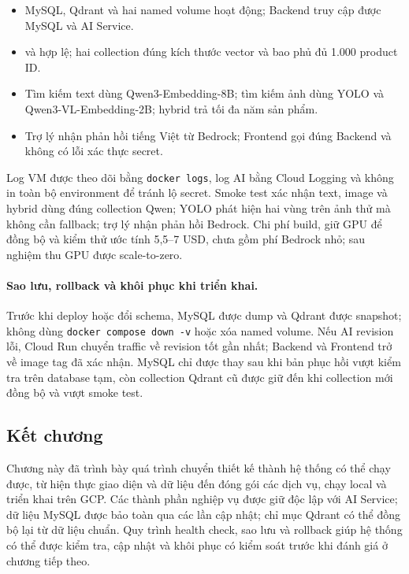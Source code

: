 \begin{itemize}
    \item MySQL, Qdrant và hai named volume hoạt động; Backend truy cập được MySQL và AI Service.
    \item {} và  hợp lệ; hai collection đúng kích thước vector và bao phủ đủ 1.000 product ID.
    \item Tìm kiếm text dùng Qwen3-Embedding-8B; tìm kiếm ảnh dùng YOLO và Qwen3-VL-Embedding-2B; hybrid trả tối đa năm sản phẩm.
    \item Trợ lý nhận phản hồi tiếng Việt từ Bedrock; Frontend gọi đúng Backend và không có lỗi xác thực secret.
\end{itemize}
Log VM được theo dõi bằng \texttt{docker logs}, log AI bằng Cloud Logging và không in toàn bộ environment để tránh lộ secret. Smoke test xác nhận text, image và hybrid dùng đúng collection Qwen; YOLO phát hiện hai vùng trên ảnh thử mà không cần fallback; trợ lý nhận phản hồi Bedrock. Chi phí build, giữ GPU để đồng bộ và kiểm thử ước tính 5,5--7 USD, chưa gồm phí Bedrock nhỏ; sau nghiệm thu GPU được scale-to-zero.

\paragraph{Sao lưu, rollback và khôi phục khi triển khai.}

Trước khi deploy hoặc đổi schema, MySQL được dump và Qdrant được snapshot; không dùng \texttt{docker compose down -v} hoặc xóa named volume. Nếu AI revision lỗi, Cloud Run chuyển traffic về revision tốt gần nhất; Backend và Frontend trở về image tag đã xác nhận. MySQL chỉ được thay sau khi bản phục hồi vượt kiểm tra trên database tạm, còn collection Qdrant cũ được giữ đến khi collection mới đồng bộ và vượt smoke test.

\subsection*{Kết chương}

Chương này đã trình bày quá trình chuyển thiết kế thành hệ thống có thể chạy được,
từ hiện thực giao diện và dữ liệu đến đóng gói các dịch vụ, chạy local và triển
khai trên GCP. Các thành phần nghiệp vụ được giữ độc lập với AI Service; dữ liệu
MySQL được bảo toàn qua các lần cập nhật; chỉ mục Qdrant có thể đồng bộ lại từ
dữ liệu chuẩn. Quy trình health check, sao lưu và rollback giúp hệ thống có thể
được kiểm tra, cập nhật và khôi phục có kiểm soát trước khi đánh giá ở chương
tiếp theo.
